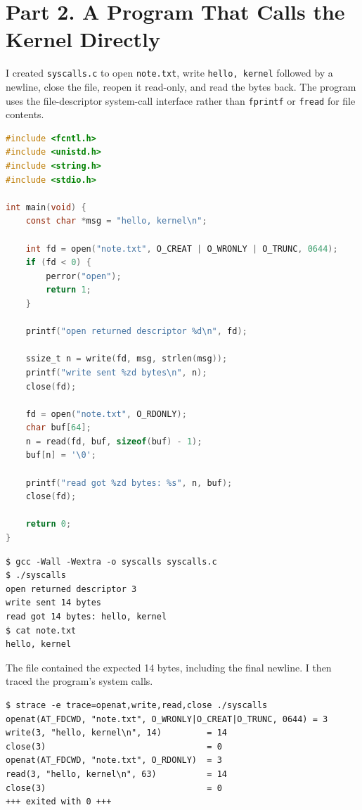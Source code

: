 \documentclass[12pt,a4paper]{article}
\begin{document}
\section{Part 2. A Program That Calls the Kernel Directly}
I created \texttt{syscalls.c} to open \texttt{note.txt}, write \texttt{hello, kernel} followed by a newline, close the file, reopen it read-only, and read the bytes back. The program uses the file-descriptor system-call interface rather than \texttt{fprintf} or \texttt{fread} for file contents.

\begin{lstlisting}[language=C,caption={Implementation of syscalls.c}]
#include <fcntl.h>
#include <unistd.h>
#include <string.h>
#include <stdio.h>

int main(void) {
    const char *msg = "hello, kernel\n";

    int fd = open("note.txt", O_CREAT | O_WRONLY | O_TRUNC, 0644);
    if (fd < 0) {
        perror("open");
        return 1;
    }

    printf("open returned descriptor %d\n", fd);

    ssize_t n = write(fd, msg, strlen(msg));
    printf("write sent %zd bytes\n", n);
    close(fd);

    fd = open("note.txt", O_RDONLY);
    char buf[64];
    n = read(fd, buf, sizeof(buf) - 1);
    buf[n] = '\0';

    printf("read got %zd bytes: %s", n, buf);
    close(fd);

    return 0;
}
\end{lstlisting}

\begin{lstlisting}[caption={Compilation and actual program output}]
$ gcc -Wall -Wextra -o syscalls syscalls.c
$ ./syscalls
open returned descriptor 3
write sent 14 bytes
read got 14 bytes: hello, kernel
$ cat note.txt
hello, kernel
\end{lstlisting}

The file contained the expected 14 bytes, including the final newline. I then traced the program's system calls.

\begin{lstlisting}[caption={Relevant events from the real syscalls trace}]
$ strace -e trace=openat,write,read,close ./syscalls
openat(AT_FDCWD, "note.txt", O_WRONLY|O_CREAT|O_TRUNC, 0644) = 3
write(3, "hello, kernel\n", 14)         = 14
close(3)                                = 0
openat(AT_FDCWD, "note.txt", O_RDONLY)  = 3
read(3, "hello, kernel\n", 63)          = 14
close(3)                                = 0
+++ exited with 0 +++
\end{lstlisting}
\end{document}
